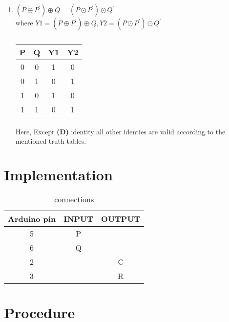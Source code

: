 \documentclass[a4paper,11pt,twocolumn]{article}
\begin{document}
\begin{enumerate}[label=\textbf{(\Alph*})]
	\item \textbf{$(P\oplus P^{\prime})\oplus Q = (P\odot P^{\prime})\odot Q^{\prime}$ }\\
where $Y1=(P\oplus P^{\prime})\oplus Q,Y2=(P\odot
    P^{\prime})\odot Q^{\prime}$\\
\bigskip
\begin{table}[ht!]
	\centering
	\begin{tabular}{ |c |c |c |c |} 
\hline 
\newline 
		\textbf{P} & \textbf{Q} & \textbf{Y1} &  \textbf{Y2}\\ 
\hline 
		0 & 0 &1 &0\\   
 		0 & 1 &0 &1\\  
 		1 & 0 &1 &0\\  
 		1 & 1 &0 &1\\  
 \hline 
 \end{tabular}
	\caption{}
\end{table}
\bigskip

\paragraph{}
	Here, Except \textbf{(D)} identity all other identies are valid according to the mentioned truth tables.
\end{enumerate}
\bigskip

\section{Implementation}
\begin{table}[h]
  \centering
  \caption{connections}
  \begin{tabular}{|c|c|c|}
\hline
Arduino pin & INPUT & OUTPUT\\
\hline
5 & P &\\
\hline
6 & Q &\\
\hline
2 & & C\\
\hline
3 & & R\\
\hline
  \end{tabular}
\end{table}

\section{Procedure}
\paragraph{}
\end{document}
